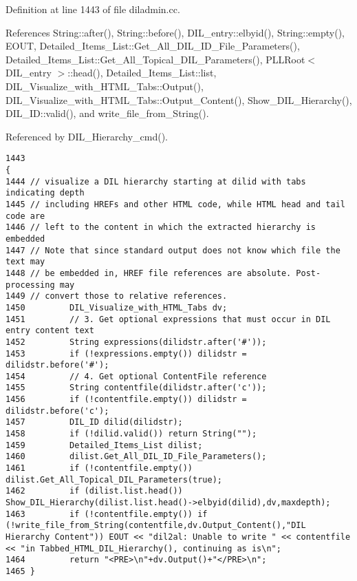 Definition at line 1443 of file diladmin.cc.

References String::after(), String::before(), DIL\_\-entry::elbyid(), String::empty(), EOUT, Detailed\_\-Items\_\-List::Get\_\-All\_\-DIL\_\-ID\_\-File\_\-Parameters(), Detailed\_\-Items\_\-List::Get\_\-All\_\-Topical\_\-DIL\_\-Parameters(), PLLRoot$<$ DIL\_\-entry $>$::head(), Detailed\_\-Items\_\-List::list, DIL\_\-Visualize\_\-with\_\-HTML\_\-Tabs::Output(), DIL\_\-Visualize\_\-with\_\-HTML\_\-Tabs::Output\_\-Content(), Show\_\-DIL\_\-Hierarchy(), DIL\_\-ID::valid(), and write\_\-file\_\-from\_\-String().

Referenced by DIL\_\-Hierarchy\_\-cmd().



\footnotesize\begin{verbatim}1443                                                                      {
1444 // visualize a DIL hierarchy starting at dilid with tabs indicating depth
1445 // including HREFs and other HTML code, while HTML head and tail code are
1446 // left to the content in which the extracted hierarchy is embedded
1447 // Note that since standard output does not know which file the text may
1448 // be embedded in, HREF file references are absolute. Post-processing may
1449 // convert those to relative references.
1450         DIL_Visualize_with_HTML_Tabs dv;
1451         // 3. Get optional expressions that must occur in DIL entry content text
1452         String expressions(dilidstr.after('#'));
1453         if (!expressions.empty()) dilidstr = dilidstr.before('#');
1454         // 4. Get optional ContentFile reference
1455         String contentfile(dilidstr.after('c'));
1456         if (!contentfile.empty()) dilidstr = dilidstr.before('c');
1457         DIL_ID dilid(dilidstr);
1458         if (!dilid.valid()) return String("");
1459         Detailed_Items_List dilist;
1460         dilist.Get_All_DIL_ID_File_Parameters();
1461         if (!contentfile.empty()) dilist.Get_All_Topical_DIL_Parameters(true);
1462         if (dilist.list.head()) Show_DIL_Hierarchy(dilist.list.head()->elbyid(dilid),dv,maxdepth);
1463         if (!contentfile.empty()) if (!write_file_from_String(contentfile,dv.Output_Content(),"DIL Hierarchy Content")) EOUT << "dil2al: Unable to write " << contentfile << "in Tabbed_HTML_DIL_Hierarchy(), continuing as is\n";
1464         return "<PRE>\n"+dv.Output()+"</PRE>\n";
1465 }
\end{verbatim}\normalsize 
{}
